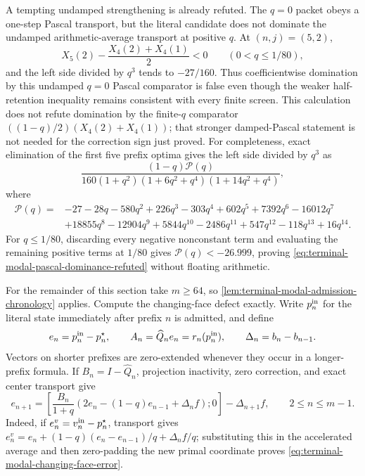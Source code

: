 

A tempting undamped strengthening is already refuted.  The $q=0$ packet obeys
a one-step Pascal transport, but the literal candidate does not dominate the
undamped arithmetic-average transport at positive $q$.  At $(n,j)=(5,2)$,
\begin{equation}
 X_5(2)-\frac{X_4(2)+X_4(1)}2<0
 \qquad(0<q\le1/80),
 \label{eq:terminal-modal-pascal-dominance-refuted}
\end{equation}
and the left side divided by $q^3$ tends to $-27/160$.  Thus coefficientwise
domination by this undamped $q=0$ Pascal comparator is false even though the
weaker half-retention inequality remains consistent with every finite screen.
This calculation does not refute domination by the finite-$q$ comparator
$((1-q)/2)(X_4(2)+X_4(1))$; that stronger damped-Pascal statement is not
needed for the correction sign just proved.  For completeness, exact elimination of
the first five prefix optima gives the left side divided by $q^3$ as
\[
 \frac{(1-q)\mathcal P(q)}
 {160(1+q^2)(1+6q^2+q^4)(1+14q^2+q^4)},
\]
where
\[
\begin{split}
 \mathcal P(q)={}&-27-28q-580q^2+226q^3-303q^4+602q^5
 +7392q^6-16012q^7\\
 &+18855q^8-12904q^9+5844q^{10}-2486q^{11}
 +547q^{12}-118q^{13}+16q^{14}.
\end{split}
\]
For $q\le1/80$, discarding every negative nonconstant term and evaluating
the remaining positive terms at $1/80$ gives
$\mathcal P(q)<-26.999$, proving
\eqref{eq:terminal-modal-pascal-dominance-refuted} without floating
arithmetic.

For the remainder of this section take $m\ge64$, so
\cref{lem:terminal-modal-admission-chronology} applies.  Compute the
changing-face defect exactly.  Write $p_n^{\rm in}$ for
the literal state immediately after prefix $n$ is admitted, and define
\begin{equation}
 e_n=p_n^{\rm in}-p_n^\star,\qquad
 A_n=\widehat Q_ne_n=r_n(p_n^{\rm in}),\qquad
 \Delta_n=b_n-b_{n-1}.
 \label{eq:terminal-modal-entry-error}
\end{equation}
Vectors on shorter prefixes are zero-extended whenever they occur in a
longer-prefix formula.  If $B_n=I-\widehat Q_n$, projection inactivity, zero
correction, and exact center transport give
\begin{equation}
 e_{n+1}
 =\left[\frac{B_n}{1+q}
 \left(2e_n-(1-q)e_{n-1}+\Delta_nf\right);0\right]
 -\Delta_{n+1}f,
 \qquad 2\le n\le m-1.
 \label{eq:terminal-modal-changing-face-error}
\end{equation}
Indeed, if $e_n^v=v_n^{\rm in}-p_n^\star$, transport gives
$e_n^v=e_n+(1-q)(e_n-e_{n-1})/q+\Delta_nf/q$; substituting this in the
accelerated average and then zero-padding the new primal coordinate proves
\eqref{eq:terminal-modal-changing-face-error}.

